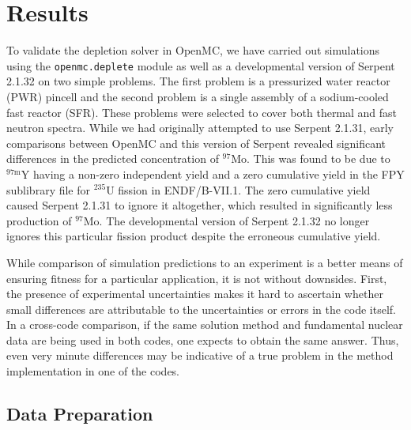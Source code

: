 \documentclass[3p,authoryear]{elsarticle}
\begin{document}
\section{Results}
\label{sec:results}

To validate the depletion solver in OpenMC, we have carried out simulations
using the \texttt{openmc.deplete} module as well as a developmental version of
Serpent 2.1.32 on two simple problems. The first problem is a pressurized water
reactor (PWR) pincell and the second problem is a single assembly of a
sodium-cooled fast reactor (SFR). These problems were selected to cover both
thermal and fast neutron spectra. While we had originally attempted to use
Serpent 2.1.31, early comparisons between OpenMC and this version of Serpent
revealed significant differences in the predicted concentration of $^{97}$Mo.
This was found to be due to $^{97\text{m}}$Y having a non-zero independent yield
and a zero cumulative yield in the FPY sublibrary file for $^{235}$U fission in
ENDF/B-VII.1. The zero cumulative yield caused Serpent 2.1.31 to ignore it
altogether, which resulted in significantly less production of $^{97}$Mo. The
developmental version of Serpent 2.1.32 no longer ignores this particular
fission product despite the erroneous cumulative yield.

While comparison of simulation predictions to an experiment is a better means of
ensuring fitness for a particular application, it is not without downsides.
First, the presence of experimental uncertainties makes it hard to ascertain
whether small differences are attributable to the uncertainties or errors in the
code itself. In a cross-code comparison, if the same solution method and
fundamental nuclear data are being used in both codes, one expects to obtain the
same answer. Thus, even very minute differences may be indicative of a true
problem in the method implementation in one of the codes.

\subsection{Data Preparation}
\end{document}
